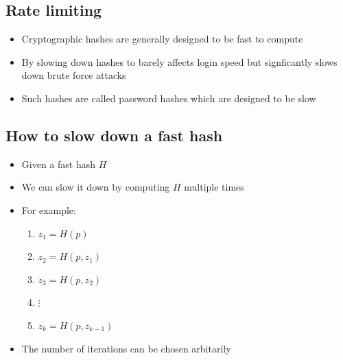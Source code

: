 \documentclass[12pt,a4paper]{article}
\begin{document}

\subsection{Rate limiting}
\begin{itemize}
    \item Cryptographic hashes are generally designed to be fast to compute  
    \item By slowing down hashes to barely affects login speed but signficantly slows down brute force attacks
    \item Such hashes are called password hashes which are designed to be slow
\end{itemize}

\subsection{How to slow down a fast hash}
\begin{itemize}
    \item Given a fast hash $H$
    \item We can slow it down by computing $H$ multiple times
    \item For example:
    \begin{enumerate}
        \item $z_1 = H(p)$
        \item $z_2 = H(p, z_1)$
        \item $z_3 = H(p, z_2)$
        \item $\vdots$
        \item $z_k = H(p, z_{k-1})$
    \end{enumerate}
    \item The number of iterations can be chosen arbitarily 
\end{itemize}
\end{document}
